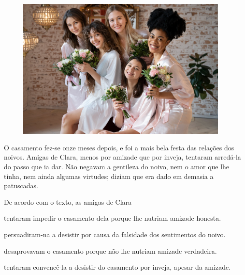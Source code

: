 \begin{figure}[H]
\centering
\includegraphics[width=0.95\textwidth]{./imgSAEB_7_POR/media/image72.png}
\end{figure} 

\begin{myquote}

O casamento fez-se onze meses depois, e foi a mais bela festa das
relações dos noivos. Amigas de Clara, menos por amizade que por
inveja, tentaram arredá-la do passo que ia dar. Não negavam a gentileza
do noivo, nem o amor que lhe tinha, nem ainda algumas virtudes; diziam
que era dado em demasia a patuscadas.


\end{myquote}

De acordo com o texto, as amigas de Clara

\begin{escolha}

    \item tentaram impedir o casamento dela porque lhe nutriam amizade honesta.

    \item persuadiram-na a desistir por causa da falsidade dos sentimentos do noivo.  

    \item desaprovavam o casamento porque não lhe nutriam amizade verdadeira.

    \item tentaram convencê-la a desistir do casamento por inveja, apesar da amizade.

\end{escolha}

